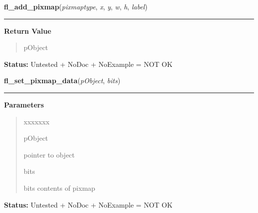     \label{xformslib:library:fl_add_pixmap}

    \vspace{0.5ex}

\hspace{.8\funcindent}\begin{boxedminipage}{\funcwidth}

    \raggedright \textbf{fl\_add\_pixmap}(\textit{pixmaptype}, \textit{x}, \textit{y}, \textit{w}, \textit{h}, \textit{label})

    \vspace{-1.5ex}

    \rule{\textwidth}{0.5\fboxrule}
\setlength{\parskip}{2ex}
\setlength{\parskip}{1ex}
      \textbf{Return Value}
    \vspace{-1ex}

      \begin{quote}
      pObject

      \end{quote}

\textbf{Status:} Untested + NoDoc + NoExample = NOT OK



    \end{boxedminipage}

    \label{xformslib:library:fl_set_pixmap_data}

    \vspace{0.5ex}

\hspace{.8\funcindent}\begin{boxedminipage}{\funcwidth}

    \raggedright \textbf{fl\_set\_pixmap\_data}(\textit{pObject}, \textit{bits})

    \vspace{-1.5ex}

    \rule{\textwidth}{0.5\fboxrule}
\setlength{\parskip}{2ex}
\setlength{\parskip}{1ex}
      \textbf{Parameters}
      \vspace{-1ex}

      \begin{quote}
        \begin{Ventry}{xxxxxxx}

          \item[pObject]

          pointer to object

          \item[bits]

          bits contents of pixmap

        \end{Ventry}

      \end{quote}

\textbf{Status:} Untested + NoDoc + NoExample = NOT OK



    \end{boxedminipage}

